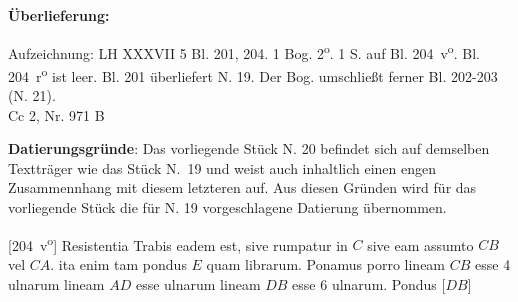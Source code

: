 \begin{ledgroupsized}[r]{120mm}
\footnotesize 
\pstart 
\noindent\textbf{\"{U}berlieferung:}
\pend
\end{ledgroupsized} 
%
\begin{ledgroupsized}[r]{114mm}
\footnotesize 
\pstart \parindent -6mm
Aufzeichnung: LH XXXVII 5 Bl. 201, 204. 1 Bog. 2\textsuperscript{o}. 1 S. auf Bl. 204~v\textsuperscript{o}. Bl. 204~r\textsuperscript{o} ist leer. Bl. 201 überliefert N. 19. %
Der Bog. umschließt ferner Bl. 202-203 (N. 21). \\%
Cc 2, Nr. 971 B
\pend
\end{ledgroupsized}
%
\vspace*{5mm}
\begin{ledgroup}
\footnotesize 
\pstart
\noindent\footnotesize{\textbf{Datierungsgr\"{u}nde}: Das vorliegende Stück N. 20 %
befindet sich auf demselben Textträger wie das Stück N.~19
und weist auch inhaltlich einen engen Zusammennhang mit diesem letzteren auf. Aus diesen Gründen wird für das vorliegende Stück die für N. 19 %
vorgeschlagene Datierung übernommen.}
\pend
\end{ledgroup}
%
\vspace*{8mm}
\count{}
\count{}
\count{}
\pstart 
\noindent
\normalsize
[204~v\textsuperscript{o}] Resistentia Trabis\protect{} eadem est, sive rumpatur in $C$ sive
eam
assumto $CB$ vel $CA.$
ita enim tam pondus $E$ quam
librarum.
\pend
\pstart
Ponamus porro lineam $CB$ esse 4 ulnarum\protect{} lineam $AD$ esse
ulnarum lineam $DB$ esse 6 ulnarum.
Pondus\protect{} 
[$DB$]
